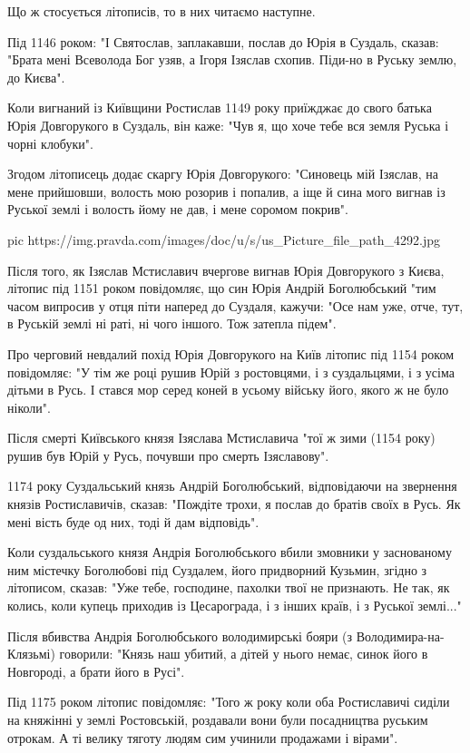 Що ж стосується літописів, то в них читаємо наступне.

Під 1146 роком: "І Святослав, заплакавши, послав до Юрія в Суздаль, сказав:
"Брата мені Всеволода Бог узяв, а Ігоря Ізяслав схопив. Піди-но в Руську землю,
до Києва".

Коли вигнаний із Київщини Ростислав 1149 року приїжджає до свого батька Юрія
Довгорукого в Суздаль, він каже: "Чув я, що хоче тебе вся земля Руська і чорні
клобуки".

Згодом літописець додає скаргу Юрія Довгорукого: "Синовець мій Ізяслав, на мене
прийшовши, волость мою розорив і попалив, а іще й сина мого вигнав із Руської
землі і волость йому не дав, і мене соромом покрив".

\ifcmt
pic https://img.pravda.com/images/doc/u/s/us_Picture_file_path_4292.jpg
\fi

Після того, як Ізяслав Мстиславич вчергове вигнав Юрія Довгорукого з Києва,
літопис під 1151 роком повідомляє, що син Юрія Андрій Боголюбський "тим часом
випросив у отця піти наперед до Суздаля, кажучи: "Осе нам уже, отче, тут, в
Руській землі ні раті, ні чого іншого. Тож затепла підем".

Про черговий невдалий похід Юрія Довгорукого на Київ літопис під 1154 роком
повідомляє: "У тім же році рушив Юрій з ростовцями, і з суздальцями, і з усіма
дітьми в Русь. І стався мор серед коней в усьому війську його, якого ж не було
ніколи".

Після смерті Київського князя Ізяслава Мстиславича "тої ж зими (1154 року)
рушив був Юрій у Русь, почувши про смерть Ізяславову".

1174 року Суздальський князь Андрій Боголюбський, відповідаючи на звернення
князів Ростиславичів, сказав: "Пождіте трохи, я послав до братів своїх в Русь.
Як мені вість буде од них, тоді й дам відповідь".

Коли суздальського князя Андрія Боголюбського вбили змовники у заснованому ним
містечку Боголюбові під Суздалем, його придворний Кузьмин, згідно з літописом,
сказав: "Уже тебе, господине, пахолки твої не признають. Не так, як колись,
коли купець приходив із Цесарограда, і з інших країв, і з Руської землі..."

Після вбивства Андрія Боголюбського володимирські бояри (з
Володимира-на-Клязьмі) говорили: "Князь наш убитий, а дітей у нього немає,
синок його в Новгороді, а брати його в Русі".

Під 1175 роком літопис повідомляє: "Того ж року коли оба Ростиславичі сиділи на
княжінні у землі Ростовській, роздавали вони були посадництва руським отрокам.
А ті велику тяготу людям сим учинили продажами і вірами".

